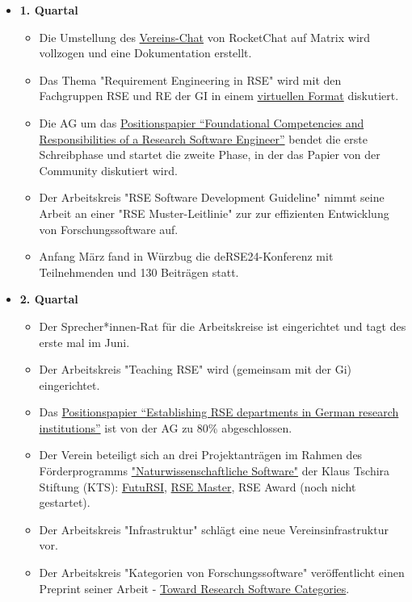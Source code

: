 \begin{itemize}
 \item[] \textbf{1. Quartal}
   \begin{itemize}
     \item Die Umstellung des \href{https://de-rse.org/de/matrix.html}{Vereins-Chat} von RocketChat auf Matrix wird vollzogen und eine Dokumentation erstellt.
     \item Das Thema "Requirement Engineering in RSE" wird mit den Fachgruppen RSE und RE der GI in einem \href{https://fg-re.gi.de/veranstaltung/event-re-and-rse}{virtuellen Format} diskutiert.
     \item Die AG um das \href{https://doi.org/10.12688/f1000research.157778.2}{Positionspapier “Foundational Competencies and Responsibilities of a Research Software Engineer”} bendet die erste Schreibphase und startet die zweite Phase, in der das Papier von der Community diskutiert wird. 
     \item Der Arbeitskreis "RSE Software Development Guideline" nimmt seine Arbeit an einer "RSE Muster-Leitlinie" zur zur effizienten Entwicklung von Forschungssoftware auf.
     \item Anfang März fand in Würzbug die deRSE24-Konferenz mit  Teilnehmenden und 130 Beiträgen statt.
  
   \end{itemize}\clearpage
 \item[] \textbf{2. Quartal}
   \begin{itemize}
    \item Der Sprecher*innen-Rat für die Arbeitskreise ist eingerichtet und tagt des erste mal im Juni.
    \item Der Arbeitskreis "Teaching RSE" wird (gemeinsam mit der Gi) eingerichtet.
    \item Das \href{https://github.com/DE-RSE/2023_paper-RSE-groups}{Positionspapier “Establishing RSE departments in German research institutions”} ist von der AG zu 80\% abgeschlossen.
    \item Der Verein beteiligt sich an drei Projektanträgen im Rahmen des Förderprogramms \href{https://klaus-tschira-stiftung.de/foerderungen/naturwissenschaftliche-software/}{"Naturwissenschaftliche Software"} der Klaus Tschira Stiftung (KTS): \href{https://www.futursi.de/}{FutuRSI}, \href{https://the-teachingrse-project.github.io/RSE-Masters/}{RSE Master}, RSE Award (noch nicht gestartet).
    \item Der Arbeitskreis "Infrastruktur" schlägt eine neue Vereinsinfrastruktur vor.
    \item Der Arbeitskreis "Kategorien von Forschungssoftware" veröffentlicht einen Preprint seiner Arbeit - \href{https://arxiv.org/abs/2404.14364}{Toward Research Software Categories}.
     

\end{itemize}
\end{itemize}
